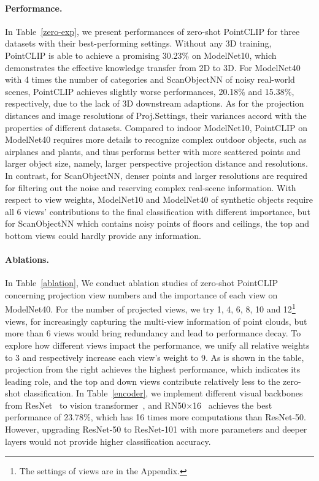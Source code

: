 \documentclass[10pt,twocolumn,letterpaper]{article}
\begin{document}
\vspace*{-5pt}
\paragraph{Performance.} In Table~\ref{zero-exp}, we present performances of zero-shot PointCLIP for three datasets with their best-performing settings. Without any 3D training, PointCLIP is able to achieve a promising 30.23$\%$ on ModelNet10, which demonstrates the effective knowledge transfer from 2D to 3D. For ModelNet40 with 4 times the number of categories and ScanObjectNN of noisy real-world scenes, PointCLIP achieves slightly worse performances, 20.18$\%$ and 15.38$\%$, respectively, due to the lack of 3D downstream adaptions. As for the projection distances and image resolutions of Proj.Settings, their variances accord with the properties of different datasets. Compared to indoor ModelNet10, PointCLIP on ModelNet40 requires more details to recognize complex outdoor objects, such as airplanes and plants, and thus performs better with more scattered points and larger object size, namely, larger perspective projection distance and resolutions. In contrast, for ScanObjectNN, denser points and larger resolutions are required for filtering out the noise and reserving complex real-scene information. With respect to view weights, ModelNet10 and ModelNet40 of synthetic objects require all 6 views' contributions to the final classification with different importance, but for ScanObjectNN which contains noisy points of floors and ceilings, the top and bottom views could hardly provide any information.

\vspace*{-8pt}
\paragraph{Ablations.}
\label{abzero}
In Table~\ref{ablation}, We conduct ablation studies of zero-shot PointCLIP concerning projection view numbers and the importance of each view on ModelNet40. For the number of projected views, we try 1, 4, 6, 8, 10 and 12\footnote{The settings of views are in the Appendix.} views, for increasingly capturing the multi-view information of point clouds, but more than 6 views would bring redundancy and lead to performance decay. To explore how different views impact the performance, we unify all relative weights to 3 and respectively increase each view's weight to 9. As is shown in the table, projection from the right achieves the highest performance, which indicates its leading role, and the top and down views contribute relatively less to the zero-shot classification. In Table~\ref{encoder}, we implement different visual backbones from ResNet~\cite{he2016deep} to vision transformer~\cite{dosovitskiy2020image}, and RN50$\times$16~\cite{radford2021learning} achieves the best performance of 23.78$\%$, which has 16 times more computations than ResNet-50. However, upgrading ResNet-50 to ResNet-101 with more parameters and deeper layers would not provide higher classification accuracy.
\end{document}
